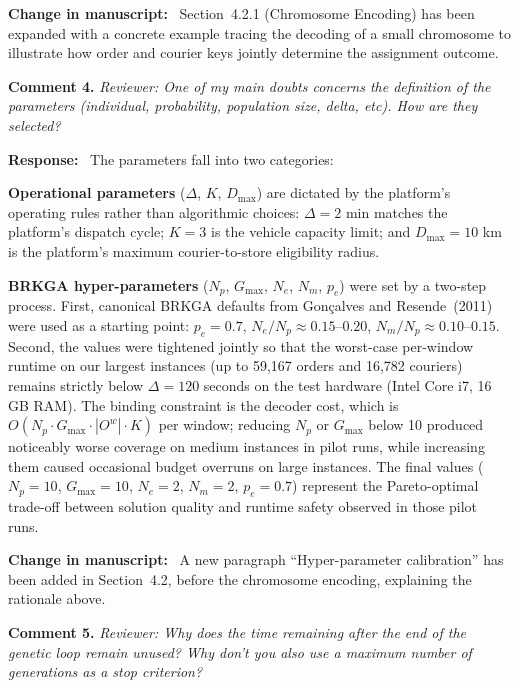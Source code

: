 \documentclass[12pt]{article}
\newcommand{\rev}[1]{\textcolor{revcolor}{\textit{Reviewer: #1}}}
\newcommand{\resp}{\noindent\textbf{Response:}\ }
\newcommand{\change}{\noindent\textbf{Change in manuscript:}\ }
\begin{document}
\change
Section~4.2.1 (Chromosome Encoding) has been expanded with a
concrete example tracing the decoding of a small chromosome to
illustrate how order and courier keys jointly determine the
assignment outcome.

\bigskip

\noindent\textbf{Comment 4.}
\rev{One of my main doubts concerns the definition of the
parameters (individual, probability, population size, delta,
etc). How are they selected?}

\resp
The parameters fall into two categories:

\textbf{Operational parameters} ($\Delta$, $K$, $D_{\max}$)
are dictated by the platform's operating rules rather than
algorithmic choices: $\Delta = 2$ min matches the platform's
dispatch cycle; $K = 3$ is the vehicle capacity limit; and
$D_{\max} = 10$ km is the platform's maximum courier-to-store
eligibility radius.

\textbf{BRKGA hyper-parameters} ($N_p$, $G_{\max}$, $N_e$,
$N_m$, $p_e$) were set by a two-step process.
First, canonical BRKGA defaults from
Gon\c{c}alves and Resende~(2011) were used as a starting
point: $p_e = 0.7$, $N_e / N_p \approx 0.15$--$0.20$,
$N_m / N_p \approx 0.10$--$0.15$.
Second, the values were tightened jointly so that the
worst-case per-window runtime on our largest instances
(up to 59,167 orders and 16,782 couriers) remains strictly
below $\Delta = 120$ seconds on the test hardware
(Intel Core i7, 16 GB RAM).
The binding constraint is the decoder cost, which is
$O(N_p \cdot G_{\max} \cdot |O^w| \cdot K)$ per window;
reducing $N_p$ or $G_{\max}$ below 10 produced noticeably
worse coverage on medium instances in pilot runs, while
increasing them caused occasional budget overruns on large
instances.
The final values ($N_p = 10$, $G_{\max} = 10$,
$N_e = 2$, $N_m = 2$, $p_e = 0.7$) represent the
Pareto-optimal trade-off between solution quality and
runtime safety observed in those pilot runs.

\change
A new paragraph ``Hyper-parameter calibration'' has been added
in Section~4.2, before the chromosome encoding, explaining the
rationale above.

\bigskip

\noindent\textbf{Comment 5.}
\rev{Why does the time remaining after the end of the genetic loop
remain unused? Why don't you also use a maximum number of
generations as a stop criterion?}
\end{document}
